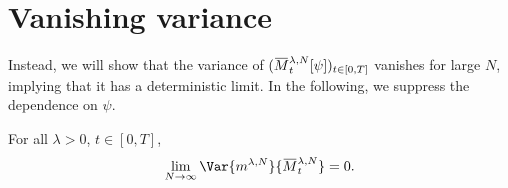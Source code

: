 \section{Vanishing variance}

Instead, we will show that the variance of \((\ol{M}_t^{\lambda,N}[\psi])_{t\in[0,T]}\) vanishes for large \(N\), implying that it has a deterministic limit.
In the following, we suppress the dependence on \(\psi\).

\begin{proposition}\label{prop:vanishing-variance}  %
  For all \(\lambda > 0\), \(t \in [0,T]\),
  \begin{equation}
    \lim_{N\to\infty} \Var{\lawmu^{\lambda,N}}{\ol{M}_t^{\lambda,N}} = 0.
  \end{equation}
\end{proposition}
